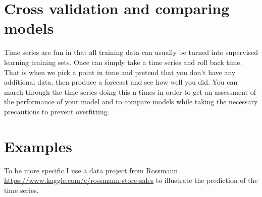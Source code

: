 \documentclass[11pt,fleqn]{book} %
\begin{document}
 

\section{Cross validation and comparing models}

Time series are fun in that all training data can usually be turned into supervised learning training sets. Once can simply take a time series and roll back time. That is when we pick a point in time and pretend that you don't have any additional data, then produce a forecast and see how well you did. You can march through the time series doing this n times in order to get an assessment of the performance of your model and to compare models while taking the necessary precautions to prevent overfitting.

\section{Examples}
To be more specific I use a data project from Rossmann \url{https://www.kaggle.com/c/rossmann-store-sales} to illustrate the prediction of the time series.
\end{document}
